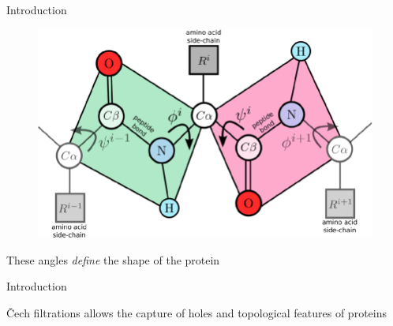 \documentclass[aspectratio=169, 10pt, dvipsnames]{beamer}
\begin{document}
{
\begin{frame}[fragile]{Introduction}
  \begin{minipage}{0.7\textwidth}
    \begin{figure}
      \centering
      \includegraphics[width=\textwidth]{./figures/phi_psi.png}
    \end{figure}
  \end{minipage}
  \hfill
  \begin{minipage}{0.25\textwidth}
    \small These angles \emph{define} the shape of the protein
  \end{minipage}
\end{frame}
}


  \begin{frame}[fragile]{Introduction}
    \begin{minipage}{0.7\textwidth}
      \begin{figure}
        \centering
        \label{fig:cech}
      \end{figure}
    \end{minipage}
    \hfill
    \begin{minipage}{0.25\textwidth}
      \small \v{C}ech filtrations allows the capture of holes and topological
      features of proteins
    \end{minipage}
  \end{frame}
\end{document}
